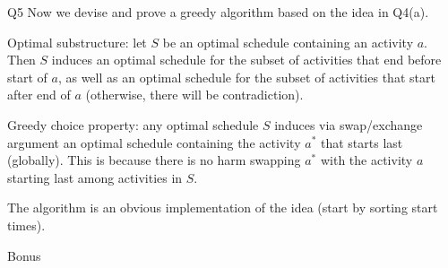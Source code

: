 \documentclass[t]{beamer}
\begin{document}
\begin{frame}{Q5}
  Now we devise and prove a greedy algorithm based on the idea in Q4(a). 
  \par Optimal substructure: let $S$ be an optimal schedule containing an activity $a$. Then $S$ induces an optimal schedule for the subset of activities that end before start of $a$, as well as an optimal schedule for the subset of activities that start after end of $a$ (otherwise, there will be contradiction). 
  \par Greedy choice property: any optimal schedule $S$ induces via swap/exchange argument an optimal schedule containing the activity $a^*$ that starts last (globally). This is because there is no harm swapping $a^*$ with the activity $a$ starting last among activities in $S$. 
  \par The algorithm is an obvious implementation of the idea (start by sorting start times). 
\end{frame}
\begin{frame}{Bonus}
  \vspace{0.5cm}
    \begin{center}
    \end{center}
\end{frame}
\end{document}
